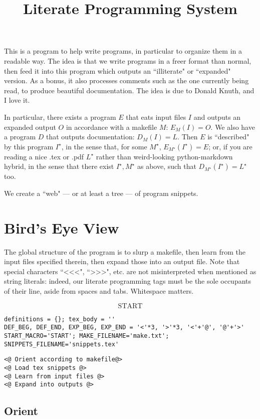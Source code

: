 \documentclass{article}
\begin{document}
\title{Literate Programming System}
\maketitle

This is a program to help write programs, in particular to organize them in a
readable way. The idea is that we write programs in a freer format than normal,
then feed it into this program which outputs an ``illiterate" or ``expanded"
version. As a bonus, it also processes comments such as the one currently being
read, to produce beautiful documentation. The idea is due to Donald Knuth, and I
love it.

In particular, there exists a program $E$ that eats input files $I$ and outputs
an expanded output $O$ in accordance with a makefile $M$: $E_M(I)=O$. We also
have a program $D$ that outputs documentation: $D_M(I)=L$. Then $E$ is
``described" by this program $I^\star$, in the sense that, for some $M^\star$,
$E_{M^\star}(I^\star)=E$; or, if you are reading a nice .tex or .pdf $L^\star$
rather than weird-looking python-markdown hybrid, in the sense that there exist
$I^\star, M^\star$ as above, such that $D_{M^\star}(I^\star)=L^\star$ too.

We create a ``web" --- or at least a tree --- of program snippets.

\section{Bird's Eye View}The global structure of the program is to slurp a makefile, then learn from the
input files specified therein, then expand those into an output file. Note that
special characters ``<<<", ``>>>", etc. are not misinterpreted when mentioned as
string literals: indeed, our literate programming tags must be the sole
occupants of their line, aside from spaces and tabs. Whitespace matters.

$$\boxed{\text{START}}$${\color{YellowOrange}\begin{verbatim}definitions = {}; tex_body = ''
DEF_BEG, DEF_END, EXP_BEG, EXP_END = '<'*3, '>'*3, '<'+'@', '@'+'>'
START_MACRO='START'; MAKE_FILENAME='make.txt'; SNIPPETS_FILENAME='snippets.tex'
\end{verbatim}}{\color{MidnightBlue}\begin{verbatim}<@ Orient according to makefile@>
<@ Load tex snippets @>
<@ Learn from input files @>
<@ Expand into outputs @>
\end{verbatim}}\subsection{Orient}
\end{document}
